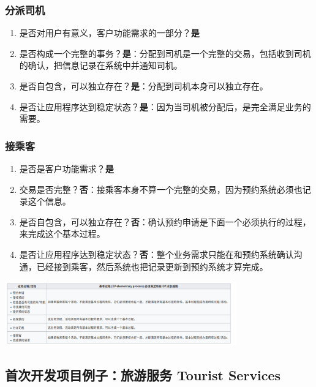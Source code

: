 \hypertarget{ux5206ux6d3eux53f8ux673a}{%
\subsubsection{分派司机}\label{ux5206ux6d3eux53f8ux673a}}

\begin{enumerate}
\tightlist
\item
  是否对用户有意义，客户功能需求的一部分？\textbf{是}
\item
  是否构成一个完整的事务？\textbf{是}：分配到司机是一个完整的交易，包括收到司机的确认，把信息记录在系统中并通知司机。
\item
  是否自包含，可以独立存在？\textbf{是}：分配到司机本身可以独立存在。
\item
  是否让应用程序达到稳定状态？\textbf{是}：因为当司机被分配后，是完全满足业务的需要。
\end{enumerate}

\hypertarget{ux63a5ux4e58ux5ba2}{%
\subsubsection{接乘客}\label{ux63a5ux4e58ux5ba2}}

\begin{enumerate}
\tightlist
\item
  是否是客户功能需求？\textbf{是}
\item
  交易是否完整？\textbf{否}：接乘客本身不算一个完整的交易，因为预约系统必须也记录这个信息。
\item
  是否自包含，可以独立存在？\textbf{否}：确认预约申请是下面一个必须执行的过程，来完成这个基本过程。
\item
  是否让应用程序达到稳定状态？\textbf{否}：整个业务需求只能在和预约系统确认沟通，已经接到乘客，然后系统也把记录更新到预约系统才算完成。
\end{enumerate}


\includegraphics[width=10cm]{Screenshotfrom2022122020-34-37.png}


\hypertarget{ux4e0eux56fdux9645ux529fux80fdux70b9ifpugux7684ux504fux5dee}{%
\subsection{首次开发项目例子：旅游服务 Tourist Services}\label{ux4e0eux56fdux9645ux529fux80fdux70b9ifpugux7684ux504fux5dee}}

